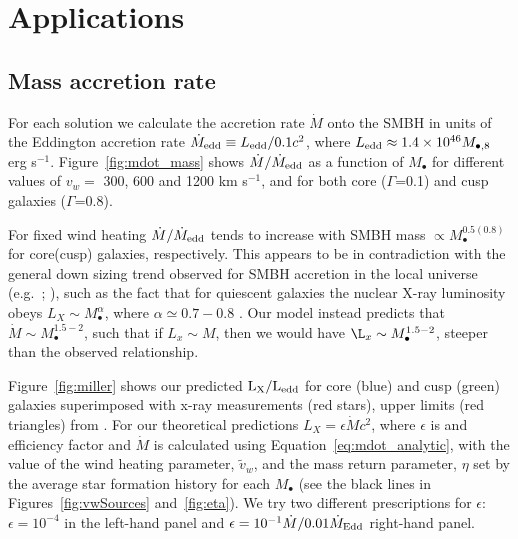\documentclass[usenatbib,fleqn]{mn2e}
\newcommand{\Mdot}{\dot{M}}
\newcommand{\MdotEdd}{\dot{M}_{\rm Edd}}
\newcommand{\vw}{\tilde{v}_{w}}
\newcommand{\Mbh}[1][]{M_{\bullet#1}}
\newcommand{\rIa}{r_{\rm Ia}}
\newcommand{\vwO}{v_{w}}
\begin{document}


\section{Applications}
\label{sec:applications}

\subsection{Mass accretion rate}
\label{sec:mdot}

For each solution we calculate the accretion rate $\dot{M}$ onto the
SMBH in units of the Eddington accretion rate $\dot{M}_{\rm edd}
\equiv L_{\rm edd}/0.1 c^{2}$, where $L_{\rm edd} \approx 1.4\times
10^{46}M_{\bullet,8}$ erg s$^{-1}$.  Figure~\ref{fig:mdot_mass} shows
$\dot{M}/\dot{M}_{\rm edd}$ as a function of $\Mbh$ for different
values of $\vwO =$ 300, 600 and 1200 km s$^{-1}$, and for both core
($\Gamma$=0.1) and cusp galaxies ($\Gamma$=0.8).

For fixed wind heating $\dot{M}/\dot{M}_{\rm edd}$ tends to increase
with SMBH mass $\propto M_{\bullet}^{0.5(0.8)}$ for core(cusp)
galaxies, respectively.  This appears to be in contradiction with the
general down sizing trend observed for SMBH accretion in the local
universe (e.g.~\citealt{Heckman+04}; \citealt{Gallo+08}), such as the
fact that for quiescent galaxies the nuclear X-ray luminosity obeys
$L_X \sim \Mbh^\alpha$, where $\alpha\simeq 0.7-0.8$
\citep{Miller+15}.  Our model instead predicts that $\Mdot
\sim \Mbh^{1.5-2}$, such that if $L_x\sim M$, then we would have $\L_x
\sim \Mbh^{1.5-2}$, steeper than the observed relationship.

Figure~\ref{fig:miller} shows our predicted ${\rm L_{X}/L_{edd}}$ for
core (blue) and cusp (green) galaxies superimposed with x-ray
measurements (red stars), upper limits (red triangles) from
\citet{Miller+15}.  For our theoretical predictions $L_X=\epsilon
\Mdot c^2$, where $\epsilon$ is and efficiency factor and $\Mdot$ is
calculated using Equation~\eqref{eq:mdot_analytic}, with the value of
the wind heating parameter, $\vw$, and the mass return parameter,
$\eta$ set by the average star formation history for each $\Mbh$ (see
the black lines in Figures~\ref{fig:vwSources} and~\ref{fig:eta}). We
try two different prescriptions for $\epsilon$: 
$\epsilon=10^{-4}$ in the left-hand panel and $\epsilon=10^{-1}
\Mdot/0.01 \MdotEdd$ right-hand panel.  
\end{document}

